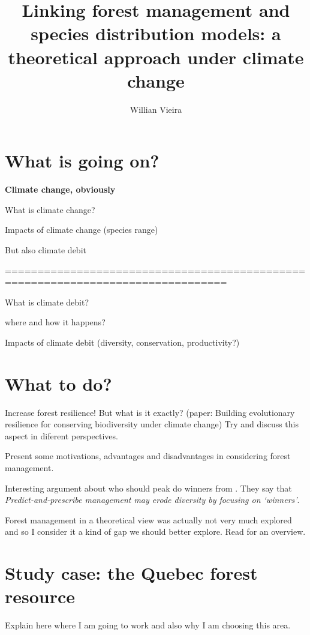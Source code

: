 \documentclass[a4paper,12pt,twoside]{article}
\begin{document}
\title{Linking forest management and species distribution models: a theoretical approach under climate change}

\author{Willian Vieira}

\maketitle

\section{What is going on?}

\textbf{Climate change, obviously}

What is climate change?

Impacts of climate change (species range)

But also climate debit

================================================================================

What is climate debit?

where and how it happens?

Impacts of climate debit (diversity, conservation, productivity?)

\section{What to do?}

Increase forest resilience! But what is it exactly?
(paper: Building evolutionary resilience for conserving biodiversity under climate change) Try and discuss this aspect in diferent perspectives.

Present some motivations, advantages and disadvantages in considering forest management.

Interesting argument about who should peak do winners from \cite{Webster2017}. They say that \textit{Predict-and-prescribe management may erode diversity by focusing on ‘winners’}.

Forest management in a theoretical view was actually not very much explored and so I consider it a kind of gap we should better explore. Read \cite{Becknell2015a} for an overview.

\section{Study case: the Quebec forest resource}

Explain here where I am going to work and also why I am choosing this area.
\end{document}
